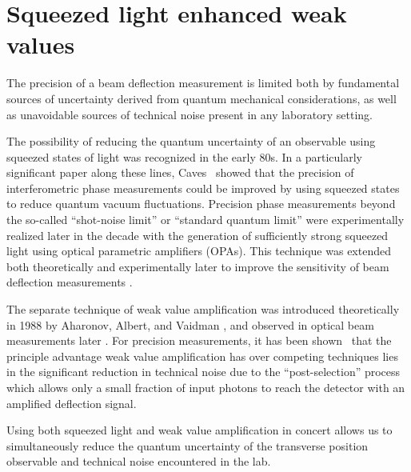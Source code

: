 \chapter[Weak values and squeezed light]{Squeezed light enhanced weak values}\label{ch:squeezed}

The precision of a beam deflection measurement is limited both by fundamental sources of uncertainty derived from quantum mechanical considerations, as well as unavoidable sources of technical noise present in any laboratory setting.  

The possibility of reducing the quantum uncertainty of an observable using squeezed states of light was recognized in the early 80s.  In a particularly significant paper along these lines, Caves~\cite{Caves1981} showed that the precision of interferometric phase measurements could be improved by using squeezed states to reduce quantum vacuum fluctuations.  Precision phase measurements beyond the so-called ``shot-noise limit'' or ``standard quantum limit'' were experimentally realized later in the decade \cite{Xiao1987} with the generation of sufficiently strong squeezed light using optical parametric amplifiers (OPAs).  This technique was extended both theoretically and experimentally later to improve the sensitivity of beam deflection measurements \citep{Treps2002,Treps2003}.

The separate technique of weak value amplification was introduced theoretically in 1988 by Aharonov, Albert, and Vaidman \cite{Aharonov1988}, and observed in optical beam measurements later \cite{Hosten2008,Dixon2009,Starling2009,Starling2010}.  For precision measurements, it has been shown~\cite{Starling2009} that the principle advantage weak value amplification has over competing techniques lies in the significant reduction in technical noise due to the ``post-selection'' process which allows only a small fraction of input photons to reach the detector with an amplified deflection signal.

Using both squeezed light and weak value amplification in concert allows us to simultaneously reduce the quantum uncertainty of the transverse position observable and technical noise encountered in the lab.  
